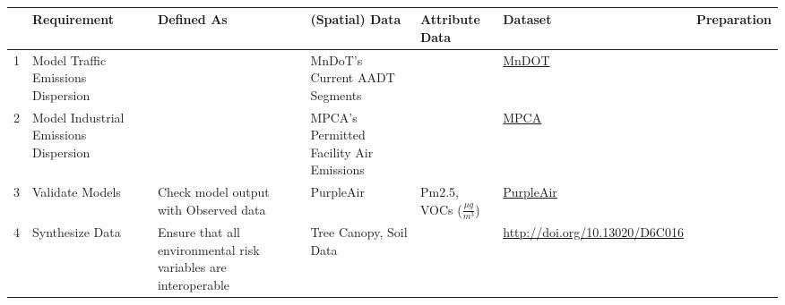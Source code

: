 \documentclass[article,12pt]{article}
\numberwithin{equation}{section}
\begin{document}
\\
{
	\scriptsize
	\begin{tabular}{|l|p{.2\linewidth}|p{.2\linewidth}|p{.2\linewidth}|p{.1\linewidth}|p{.1\linewidth}|p{.1\linewidth}|}
	\hline	& \textbf{Requirement} & \textbf{Defined As} & \textbf{(Spatial) Data} & \textbf{Attribute Data} & \textbf{Dataset} & \textbf{Preparation} \\ \hline
		1 & Model Traffic Emissions Dispersion         &                                                                & MnDoT’s Current AADT Segments           &                                                   & \href{https://gisdata.mn.gov/dataset/trans-aadt-traffic-segments}{MnDOT}                                                                                                                 &             \\ \hline
		2 & Model Industrial Emissions Dispersion      &                                                                & MPCA’s Permitted Facility Air Emissions &                                                   & \href{https://www.pca.state.mn.us/air/permitted-facility-air-emissions-data}{MPCA}                                                                                                      &             \\ \hline
		3 & Validate Models                            & Check model output with Observed data                          & PurpleAir                               & Pm2.5, VOCs ($\frac{\mu g}{m^3}$) & \href{https://api.purpleair.com/}{PurpleAir}                                                                                                                                                 &             \\ \hline
		4 & Synthesize Data                            & Ensure that all environmental risk variables are interoperable & Tree Canopy, Soil Data                  &                                                   & \url{http://doi.org/10.13020/D6C016}                                                                                                                                            &             \\ \hline

\end{tabular}}
\end{document}
